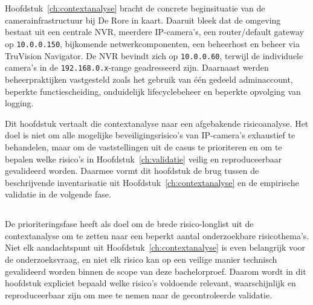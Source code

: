 
\chapter{}%
\label{ch:risicoanalyse}

Hoofdstuk~\ref{ch:contextanalyse} bracht de concrete beginsituatie van de camerainfrastructuur bij De Rore in kaart. Daaruit bleek dat de omgeving bestaat uit een centrale NVR, meerdere IP-camera's, een router/default gateway op \texttt{10.0.0.150}, bijkomende netwerkcomponenten, een beheerhost en beheer via TruVision Navigator. De NVR bevindt zich op \texttt{10.0.0.60}, terwijl de individuele camera's in de \texttt{192.168.0.x}-range geadresseerd zijn. Daarnaast werden beheerpraktijken vastgesteld zoals het gebruik van één gedeeld adminaccount, beperkte functiescheiding, onduidelijk lifecyclebeheer en beperkte opvolging van logging.

Dit hoofdstuk vertaalt die contextanalyse naar een afgebakende risicoanalyse. Het doel is niet om alle mogelijke beveiligingsrisico's van IP-camera's exhaustief te behandelen, maar om de vaststellingen uit de casus te prioriteren en om te bepalen welke risico's in Hoofdstuk~\ref{ch:validatie} veilig en reproduceerbaar gevalideerd worden. Daarmee vormt dit hoofdstuk de brug tussen de beschrijvende inventarisatie uit Hoofdstuk~\ref{ch:contextanalyse} en de empirische validatie in de volgende fase.

\section{}%
\label{sec:risico-doel}

De prioriteringsfase heeft als doel om de brede risico-longlist uit de contextanalyse om te zetten naar een beperkt aantal onderzoekbare risicothema's. Niet elk aandachtspunt uit Hoofdstuk~\ref{ch:contextanalyse} is even belangrijk voor de onderzoeksvraag, en niet elk risico kan op een veilige manier technisch gevalideerd worden binnen de scope van deze bachelorproef. Daarom wordt in dit hoofdstuk expliciet bepaald welke risico's voldoende relevant, waarschijnlijk en reproduceerbaar zijn om mee te nemen naar de gecontroleerde validatie.

